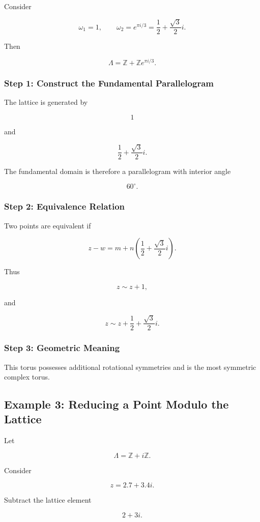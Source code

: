 \documentclass[12pt,a4paper]{article}
\theoremstyle{notespace}
\begin{document}
Consider

\[
\omega_1=1,
\qquad
\omega_2=e^{\pi i/3}
=
\frac12+\frac{\sqrt3}{2}i.
\]

Then

\[
\Lambda
=
\mathbb Z
+
\mathbb Z e^{\pi i/3}.
\]

\subsubsection*{Step 1: Construct the Fundamental Parallelogram}

The lattice is generated by

\[
1
\]

and

\[
\frac12+\frac{\sqrt3}{2}i.
\]

The fundamental domain is therefore a parallelogram with interior angle

\[
60^\circ.
\]

\subsubsection*{Step 2: Equivalence Relation}

Two points are equivalent if

\[
z-w
=
m+n
\left(
\frac12+\frac{\sqrt3}{2}i
\right).
\]

Thus

\[
z
\sim
z+1,
\]

and

\[
z
\sim
z+\frac12+\frac{\sqrt3}{2}i.
\]

\subsubsection*{Step 3: Geometric Meaning}

This torus possesses additional rotational symmetries and is the most symmetric complex torus.

\subsection{Example 3: Reducing a Point Modulo the Lattice}

Let

\[
\Lambda
=
\mathbb Z+i\mathbb Z.
\]

Consider

\[
z
=
2.7+3.4i.
\]

Subtract the lattice element

\[
2+3i.
\]
\end{document}
